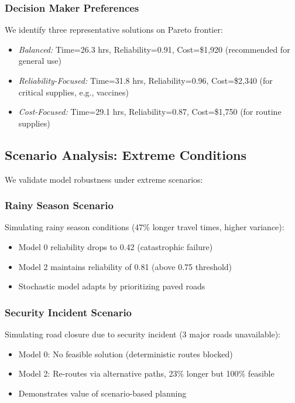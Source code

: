 \subsubsection{Decision Maker Preferences}

We identify three representative solutions on Pareto frontier:
\begin{itemize}
\item \textit{Balanced:} Time=26.3 hrs, Reliability=0.91, Cost=\$1,920 (recommended for general use)
\item \textit{Reliability-Focused:} Time=31.8 hrs, Reliability=0.96, Cost=\$2,340 (for critical supplies, e.g., vaccines)
\item \textit{Cost-Focused:} Time=29.1 hrs, Reliability=0.87, Cost=\$1,750 (for routine supplies)
\end{itemize}

\subsection{Scenario Analysis: Extreme Conditions}

We validate model robustness under extreme scenarios:

\subsubsection{Rainy Season Scenario}

Simulating rainy season conditions (47\% longer travel times, higher variance):
\begin{itemize}
\item Model 0 reliability drops to 0.42 (catastrophic failure)
\item Model 2 maintains reliability of 0.81 (above 0.75 threshold)
\item Stochastic model adapts by prioritizing paved roads
\end{itemize}

\subsubsection{Security Incident Scenario}

Simulating road closure due to security incident (3 major roads unavailable):
\begin{itemize}
\item Model 0: No feasible solution (deterministic routes blocked)
\item Model 2: Re-routes via alternative paths, 23\% longer but 100\% feasible
\item Demonstrates value of scenario-based planning
\end{itemize}

